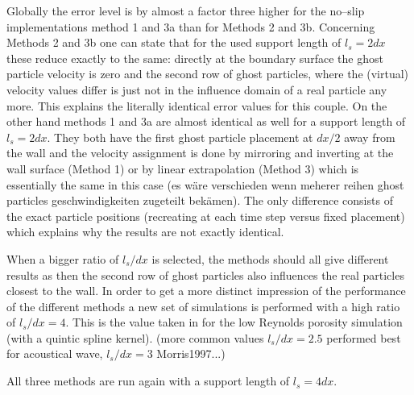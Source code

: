 \documentclass{report}
\begin{document}
Globally the error level is by almost a factor three higher for the no--slip implementations method 1 and 3a than for Methods 2 and 3b.
Concerning Methods 2 and 3b one can state that for the used support length of $l_s=2dx$
these reduce exactly to the same: directly at the boundary surface the ghost particle velocity is zero and the second row of ghost particles, where the (virtual) velocity values differ is just not in the influence domain of a real particle any more. This explains the literally identical error values for this couple. On the other hand methods 1 and 3a are almost identical as well for a support length of $l_s=2dx$. They both have the first ghost particle placement at $dx/2$ away from the wall and the velocity assignment is done by mirroring and inverting at the wall surface (Method 1) or by linear extrapolation (Method 3) which is essentially the same in this case (es wäre verschieden wenn meherer reihen ghost particles geschwindigkeiten zugeteilt bekämen). The only difference consists of the exact particle positions (recreating at each time step versus fixed placement) which explains why the results are not exactly identical.

When a bigger ratio of $l_s/dx$ is selected, the methods should all give different results as then the second row of ghost particles also influences the real particles closest to the wall. In order to get a more distinct impression of the performance of the different methods a new set of simulations is performed with a high ratio of $l_s/dx=4$. This is the value taken in \cite{Zhu1999} for the low Reynolds porosity simulation (with a quintic spline kernel). (more common values $l_s/dx=2.5$ performed best for acoustical wave, $l_s/dx=3$ Morris1997...)


All three methods are run again with a support length of $l_s=4dx$.
\end{document}

